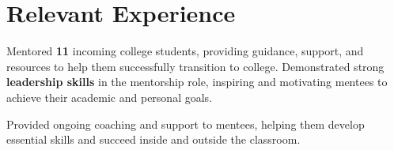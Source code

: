 
\section{Relevant Experience}
\begin{tightemize}
  \item Mentored {\bf 11} incoming college students, providing guidance, support, and resources to help them successfully transition to college. Demonstrated strong {\bf leadership skills} in the mentorship role, inspiring and motivating mentees to achieve their academic and personal goals.
  \item Provided ongoing coaching and support to mentees, helping them develop essential skills and succeed inside and outside the classroom.
\end{tightemize}